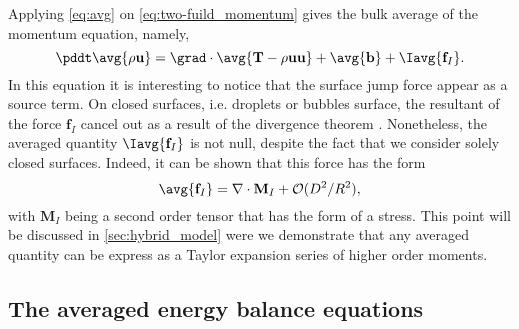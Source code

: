 Applying \ref{eq:avg} on \ref{eq:two-fuild_momentum} gives the bulk average of the momentum equation, namely,
\begin{equation}
    \pddt 
        \avg{\rho\textbf{u}}
    = \grad \cdot \avg{
        \textbf{T}
        -  \rho \textbf{u} \textbf{u}} 
    + \avg{\textbf{b}}
    + \Iavg{\textbf{f}_I}.
    \label{eq:avg_momentum}
\end{equation}
In this equation it is interesting to notice that the surface jump force appear as a source term. 
On closed surfaces, i.e. droplets or bubbles surface, the resultant of the force $\textbf{f}_I$ cancel out as a result of the divergence theorem \citep{tryggvason2011direct}. 
Nonetheless, the averaged quantity $\Iavg{\textbf{f}_I}$ is not null, despite the fact that we consider solely closed surfaces.
Indeed, it can be shown that this force has the form 
\begin{equation*}
    \avg{\textbf{f}_I}
    = \nabla \cdot \textbf{M}_I + \mathcal{O}(D^2/R^2),
\end{equation*} 
with $\textbf{M}_I$ being a second order tensor that has the form of a stress. 
This point will be discussed in \ref{sec:hybrid_model} were we demonstrate that any averaged quantity can be express as a Taylor expansion series of higher order moments. 

\subsection{The averaged energy balance equations}

